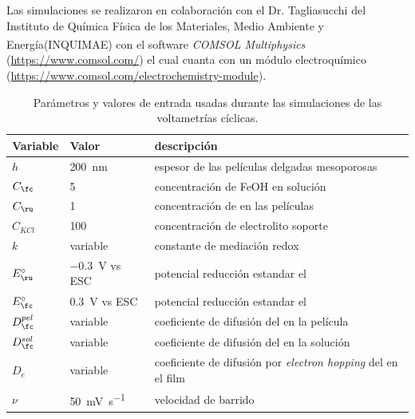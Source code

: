 	 	
	 		\pagebreak	
			
			 Las simulaciones se realizaron en colaboración con el Dr. Tagliasucchi del Instituto de Química Física de los Materiales, Medio Ambiente y Energía\linebreak  (INQUIMAE) con el software \textit{COMSOL Multiphysics\textsuperscript\textregistered} (\url{https://www.comsol.com/}) el cual cuanta con un módulo electroquímico (\url{https://www.comsol.com/electrochemistry-module}).

	    	\begin{table}[hb!]
	 	    \caption[Parámetros de las simulaciones]{Parámetros y valores de entrada usadas durante las simulaciones de las voltametrías cíclicas.}
	 	    \begin{tabular}{>{\raggedright\arraybackslash}m{1.4cm}>{\centering\arraybackslash}m{2.8cm}>{\raggedright\arraybackslash}m{6.7cm}} 
	 	    \toprule
	 	    Variable  & 	Valor  &   descripción      \\ \midrule
	 	    $h$  	  &  \hspace{-5mm} \SI{200}{nm}	& 	   espesor\index{espesor} de las películas delgadas mesoporosas 	    \\ \midrule
	 	    $C_{\fc}$  & \SI{5}{\milli\Molar}  & concentración de FeOH en solución    \\ \midrule
	 	    $C_{\ru}$ & \SI{1}{\milli\Molar}  & concentración de \ru\space en las películas    \\ \midrule
	 	    $C_{KCl}$ & \hspace{-5mm}  \SI{100}{\milli\Molar}  & concentración de electrolito soporte    \\ \midrule
	 	    $k$ 		   & variable 	 & 	constante de mediación\index{mediacion} redox    \\ \midrule
	 	    $E^\circ_{\ru}$  & \hspace{-3mm}\SI{-0.3}{\volt} vs ESC & potencial reducción estandar el \ru \\ \midrule
	 	    $E^\circ_{\fc}$  & \SI{0.3}{\volt} vs ESC & potencial reducción estandar el \fc \\ \midrule
	 	    $D_{\fc}^{pel} $  & variable & coeficiente de difusión\index{difusión} del \fc\space en la película \\ \midrule
	 	    $D_{\fc}^{sol} $  & variable & coeficiente de difusión\index{difusión} del \fc\space en la solución \\ \midrule
	 	    $D_{e}$  & variable & coeficiente de difusión\index{difusión} por \textit{electron hopping }del \ru\space en el film \\ \midrule
	 	    $\nu$    & \hspace{3.5mm} \SI{50}{\milli\volt\per\second}  &  velocidad de barrido\index{velocidad!de barrido} \\
	 	     \bottomrule
			\end{tabular}
			\label{tabla:simulacion}
			\end{table} 

